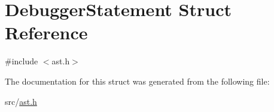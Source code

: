\hypertarget{struct_debugger_statement}{}\section{Debugger\+Statement Struct Reference}
\label{struct_debugger_statement}


{\ttfamily \#include $<$ast.\+h$>$}



The documentation for this struct was generated from the following file\+:\begin{DoxyCompactItemize}
\item 
src/\hyperlink{ast_8h}{ast.\+h}\end{DoxyCompactItemize}
